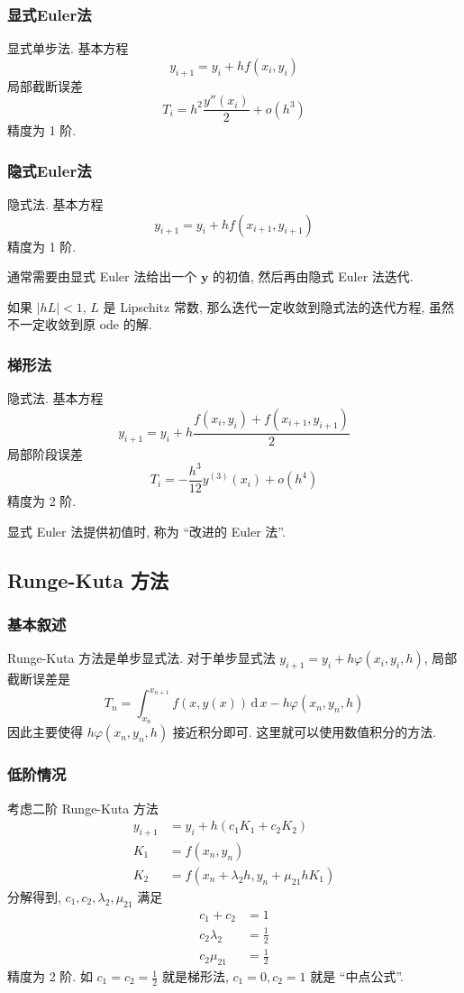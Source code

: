 \documentclass{ctexart}
\newcommand{\ud}{\,\mathrm{d}\,}
\begin{document}
\subsubsection{显式Euler法}
    显式单步法. 基本方程\[
        y_{i+1} = y_i + h f(x_i, y_i)\]
    局部截断误差 \[
        T_i = h^2 \frac{y''(x_i)}{2} + o(h^3)\]
    精度为 1 阶.
\subsubsection{隐式Euler法}
    隐式法. 基本方程\[
        y_{i+1} = y_i + h f(x_{i+1}, y_{i+1})\]
    精度为 1 阶.\par
    通常需要由显式 Euler 法给出一个 $\mathbf{y}$ 的初值,
    然后再由隐式 Euler 法迭代.\par
    如果 $|hL| < 1$, $L$ 是 Lipschitz 常数, 那么迭代一定收敛到隐式法的迭代方程,
    虽然不一定收敛到原 ode 的解.
\subsubsection{梯形法}
    隐式法. 基本方程\[
        y_{i+1} = y_i + h \frac{f(x_i, y_i) + f(x_{i+1}, y_{i+1})}{2}\]
    局部阶段误差 \[
        T_i = -\frac{h^3}{12} y^{(3)}(x_i) + o(h^4)\]
    精度为 2 阶.\par
    显式 Euler 法提供初值时, 称为 ``改进的 Euler 法''.

\subsection{Runge-Kuta 方法}
\subsubsection{基本叙述}
    Runge-Kuta 方法是单步显式法.
    对于单步显式法 $y_{i+1} = y_i + h \varphi(x_i, y_i, h)$,
    局部截断误差是 \[
        T_n = \int_{x_n}^{x_{n+1}} f(x, y(x)) \ud x - h \varphi(x_n, y_n, h)\]
    因此主要使得 $h \varphi(x_n, y_n, h)$ 接近积分即可. 这里就可以使用数值积分的方法.
\subsubsection{低阶情况}
    考虑二阶 Runge-Kuta 方法 \begin{align*}
        y_{i+1} &= y_i + h (c_1 K_1 + c_2 K_2)\\
        K_1 &= f(x_n, y_n)\\
        K_2 &= f(x_n + \lambda_2 h, y_n + \mu_{21} h K_1)
    \end{align*}
    分解得到, $c_1, c_2, \lambda_2, \mu_{21}$ 满足 \begin{align*}
        c_1 + c_2 &= 1\\
        c_2 \lambda_2 &= \frac{1}{2}\\
        c_2 \mu_{21} &= \frac{1}{2}
    \end{align*}
    精度为 2 阶. 如 $c_1 = c_2 = \frac{1}{2}$ 就是梯形法, $c_1 = 0, c_2 = 1$ 就是 ``中点公式''.
\end{document}
